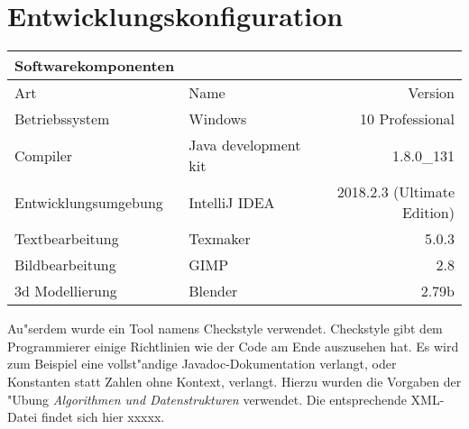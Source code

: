 \section{Entwicklungskonfiguration}
\label{sec:entwicklungskonfiguration}
\begin{table}[h!]
	\begin{tabular}{llr} 
	\toprule
	Softwarekomponenten\\  
	\midrule 
	Art & Name & Version\\ 
	\midrule 
	Betriebssystem & Windows & 10 Professional\\ 
	Compiler & Java development kit & 1.8.0\_131\\
  Entwicklungsumgebung & IntelliJ IDEA & 2018.2.3 (Ultimate Edition)\\
  Textbearbeitung & Texmaker & 5.0.3\\
  Bildbearbeitung & GIMP & 2.8\\
  3d Modellierung & Blender & 2.79b\\
	\bottomrule
	\end{tabular}
	\label{tab:ablaufbedingungen}
\end{table}
Au"serdem wurde ein Tool namens Checkstyle verwendet. Checkstyle gibt dem Programmierer einige 
Richtlinien wie der Code am Ende auszusehen hat. Es wird zum Beispiel eine vollst"andige Javadoc-Dokumentation
verlangt, oder Konstanten statt Zahlen ohne Kontext, verlangt. Hierzu wurden die Vorgaben der "Ubung 
\emph{Algorithmen und Datenstrukturen} verwendet. Die entsprechende XML-Datei findet sich hier xxxxx.
